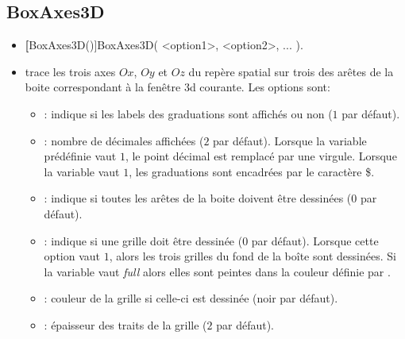 \subsection{BoxAxes3D}
\begin{itemize}
 \item \util \textbf[BoxAxes3D()]{BoxAxes3D( <option1>, <option2>, ... )}.
 \item \desc trace les trois axes $Ox$, $Oy$ et $Oz$ du repère spatial sur trois des arêtes de la boite correspondant à la fenêtre 3d courante. Les options sont:

  \begin{itemize}
  \item {}: indique si les labels des graduations sont affichés ou non ($1$ par défaut).
  \item {}: nombre de décimales affichées ($2$ par défaut). Lorsque la variable prédéfinie  vaut $1$, le point décimal est remplacé par une virgule. Lorsque la variable  vaut $1$, les graduations sont encadrées par le caractère \$.
  \item {}: indique si toutes les arêtes de la boite doivent être dessinées ($0$ par défaut).

  \item {}: indique si une grille doit être dessinée ($0$ par défaut). Lorsque cette option vaut $1$, alors les trois grilles du fond de la boîte sont dessinées. Si la variable  vaut \textit{full} alors elles sont peintes dans la couleur définie par .
  \item {}: couleur de la grille si celle-ci est dessinée (noir par défaut).
  \item {}: épaisseur des traits de la grille ($2$ par défaut).


\end{itemize}
\end{itemize}
